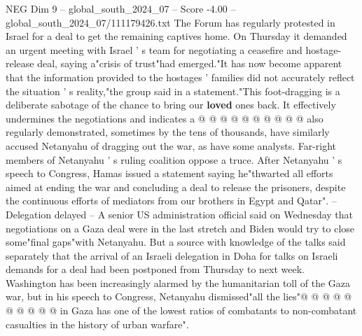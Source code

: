 \begin{textsample}{NEG Dim 9 – global\_south\_2024\_07 – Score -4.00 – global\_south\_2024\_07/111179426.txt}
The Forum has regularly protested in Israel for a deal to get the remaining captives home.
On Thursday it demanded an urgent meeting with Israel ' s team for negotiating a ceasefire and hostage-release deal, saying a"crisis of trust"had emerged."It has now become apparent that the information provided to the hostages ' families did not accurately reflect the situation ' s reality,"the group said in a statement."This foot-dragging is a deliberate sabotage of the chance to bring our \textbf{loved} ones back.
It effectively undermines the negotiations and indicates a @ @ @ @ @ @ @ @ @ @ also regularly demonstrated, sometimes by the tens of thousands, have similarly accused Netanyahu of dragging out the war, as have some analysts.
Far-right members of Netanyahu ' s ruling coalition oppose a truce.
After Netanyahu ' s speech to Congress, Hamas issued a statement saying he"thwarted all efforts aimed at ending the war and concluding a deal to release the prisoners, despite the continuous efforts of mediators from our brothers in Egypt and Qatar". -- Delegation delayed -- A senior US administration official said on Wednesday that negotiations on a Gaza deal were in the last stretch and Biden would try to close some"final gaps"with Netanyahu.
But a source with knowledge of the talks said separately that the arrival of an Israeli delegation in Doha for talks on Israeli demands for a deal had been postponed from Thursday to next week.
Washington has been increasingly alarmed by the humanitarian toll of the Gaza war, but in his speech to Congress, Netanyahu dismissed"all the lies"@ @ @ @ @ @ @ @ @ @ in Gaza has one of the lowest ratios of combatants to non-combatant casualties in the history of urban warfare".

\end{textsample}
